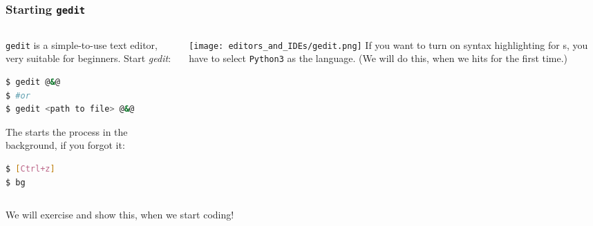 \begin{frame}[fragile]
  \frametitle{Starting \texttt{gedit}}
  \begin{columns}[T]
  	 \begin{column}{.5\textwidth}
  	   \texttt{gedit} is a simple-to-use text editor, very suitable for beginners.\newline
        Start \textit{gedit}:
       \begin{lstlisting}[language=Bash, style=Shell]
$ gedit @&@
$ #or
$ gedit <path to file> @&@
      \end{lstlisting}
      The \altverb{&} starts the process in the background, if you forgot it:
      \begin{lstlisting}[language=Bash, style=Shell]
$ [Ctrl+z]
$ bg
      \end{lstlisting}	
    \end{column}
    \begin{column}{.5\textwidth}
      \texttt{[image: editors\_and\_IDEs/gedit.png]}	\newline
        If you want to turn on syntax highlighting for s, you have to select \texttt{Python3} as the language. (We will do this, when we hits for the first time.)
    \end{column} 
  \end{columns}
  \begin{hint}[Note]
    We will exercise and show this, when we start coding!
  \end{hint}
\end{frame}
